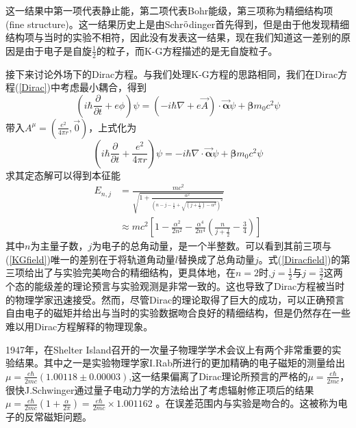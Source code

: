 这一结果中第一项代表静止能，第二项代表Bohr能级，第三项称为精细结构项(fine structure)。这一结果历史上是由Schr$\ddot{\rm{o}}$dinger首先得到，但是由于他发现精细结构项与当时的实验不相符，因此没有发表这一结果，现在我们知道这一差别的原因是由于电子是自旋$\frac{1}{2}$的粒子，而K-G方程描述的是无自旋粒子。

接下来讨论外场下的Dirac方程。与我们处理K-G方程的思路相同，我们在Dirac方程(\ref{Dirac})中考虑最小耦合，得到
\begin{equation}
      \left(i\hbar \frac{\partial}{\partial t}+e\phi\right)\psi=\left(-i\hbar\nabla+e\vec{A}\right)\cdot \vec{\pmb{\alpha}}\psi +\pmb{\beta}m_{0}c^{2}\psi
\end{equation}
带入$A^{\mu}=(\frac{e^{2}}{4\pi r},\vec{0})$，上式化为
\begin{equation}
      \left(i\hbar \frac{\partial}{\partial t}+\frac{e^{2}}{4\pi r}\right)\psi=-i\hbar\nabla\cdot \vec{\pmb{\alpha}}\psi +\pmb{\beta}m_{0}c^{2}\psi
\end{equation}
求其定态解可以得到本征能
\begin{equation}
\begin{aligned}
\label{Diracfield}
    E_{n,j} & =\frac{mc^{2}}{\sqrt{1+   \frac{\alpha^{2}} {   \left(n-j-\frac{1}{2}+ \sqrt{(j+\frac{1}{2})-\alpha^{2}}  \right)^{2}    }    }}\\
    & \approx mc^{2}\left[1-\frac{\alpha^{2}}{2n^{2}}-\frac{\alpha^{4}}{2n^{4}}\left(\frac{n}{j+\frac{1}{2}}-\frac{3}{4}\right)\right]
    \end{aligned}
\end{equation}
其中$n$为主量子数，$j$为电子的总角动量，是一个半整数。可以看到其前三项与(\ref{KGfield})唯一的差别在于将轨道角动量$l$替换成了总角动量$j$。式(\ref{Diracfield})的第三项给出了与实验完美吻合的精细结构，更具体地，在$n=2$时,$j=\frac{1}{2}$与$j=\frac{3}{2}$这两个态的能级差的理论预言与实验观测是非常一致的。这也导致了Dirac方程被当时的物理学家迅速接受。然而，尽管Dirac的理论取得了巨大的成功，可以正确预言自由电子的磁矩并给出与当时的实验数据吻合良好的精细结构，但是仍然存在一些难以用Dirac方程解释的物理现象。

1947年，在Shelter Island召开的一次量子物理学学术会议上有两个非常重要的实验结果。其中之一是实验物理学家I.Rab所进行的更加精确的电子磁矩的测量给出$\mu=\frac{e\hbar}{2mc}(1.00118\pm 0.00003)$,这一结果偏离了Dirac理论所预言的严格的$\mu=\frac{e\hbar}{2mc}$，很快J.Schwinger通过量子电动力学的方法给出了考虑辐射修正项后的结果
$\mu=\frac{e\hbar}{2mc}\left(1+\frac{\alpha}{2\pi}\right)=\frac{e\hbar}{2mc}\times 1.001162$
。在误差范围内与实验是吻合的。这被称为电子的反常磁矩问题。


